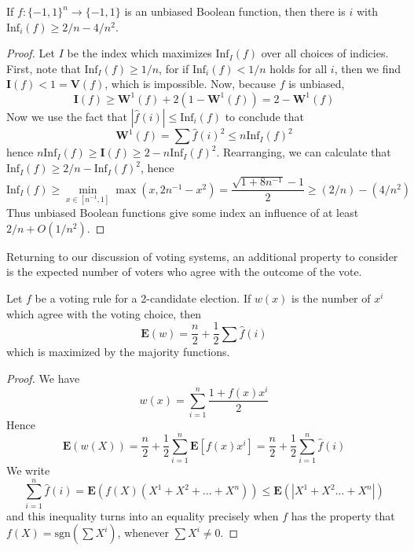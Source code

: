 \begin{lemma}
    If $f: \{ -1, 1 \}^n \to \{ -1, 1 \}$ is an unbiased Boolean function, then there is $i$ with $\text{Inf}_i(f) \geq 2/n - 4/n^2$.
\end{lemma}
\begin{proof}
    Let $I$ be the index which maximizes $\text{Inf}_I(f)$ over all choices of indicies. First, note that $\text{Inf}_I(f) \geq 1/n$, for if $\text{Inf}_i(f) < 1/n$ holds for all $i$, then we find $\mathbf{I}(f) < 1 = \mathbf{V}(f)$, which is impossible. Now, because $f$ is unbiased,
    \[ \mathbf{I}(f) \geq \mathbf{W}^1(f) + 2(1 - \mathbf{W}^1(f)) = 2 - \mathbf{W}^1(f) \]
    Now we use the fact that $|\widehat{f}(i)| \leq \text{Inf}_i(f)$ to conclude that
    \[ \mathbf{W}^1(f) = \sum \widehat{f}(i)^2 \leq n \text{Inf}_I(f)^2 \]
    hence $n \text{Inf}_I(f) \geq \mathbf{I}(f) \geq 2 - n \text{Inf}_I(f)^2$. Rearranging, we can calculate that $\text{Inf}_I(f) \geq 2/n - \text{Inf}_I(f)^2$, hence
    \[ \text{Inf}_I(f) \geq \min_{x \in [n^{-1},1]} \max(x, 2n^{-1} - x^2) = \frac{\sqrt{1 + 8n^{-1}} - 1}{2} \geq (2/n) - (4/n^2) \]
    Thus unbiased Boolean functions give some index an influence of at least $2/n + O(1/n^2)$.
\end{proof}

Returning to our discussion of voting systems, an additional property to consider is the expected number of voters who agree with the outcome of the vote.

\begin{theorem}
    Let $f$ be a voting rule for a 2-candidate election. If $w(x)$ is the number of $x^i$ which agree with the voting choice, then
    \[ \mathbf{E}(w) = \frac{n}{2} + \frac{1}{2} \sum \widehat{f}(i) \]
    which is maximized by the majority functions.
\end{theorem}
\begin{proof}
    We have
    \[ w(x) = \sum_{i = 1}^n \frac{1 + f(x) x^i}{2} \]
    Hence
    \[ \mathbf{E}(w(X)) = \frac{n}{2} + \frac{1}{2} \sum_{i = 1}^n \mathbf{E}[f(x)x^i] = \frac{n}{2} + \frac{1}{2} \sum_{i = 1}^n \widehat{f}(i) \]
    We write
    \[ \sum_{i = 1}^n \widehat{f}(i) = \mathbf{E}(f(X)(X^1 + X^2 + \dots + X^n)) \leq \mathbf{E}(|X^1 + X^2 \dots + X^n|) \]
    and this inequality turns into an equality precisely when $f$ has the property that $f(X) = \text{sgn}(\sum X^i)$, whenever $\sum X^i \neq 0$.
\end{proof}

